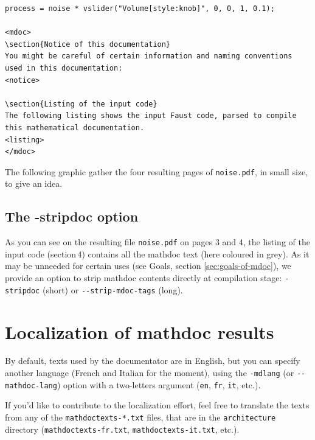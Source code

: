 \documentclass[a4paper]{book}
\begin{document}
\begin{lstlisting}
process = noise * vslider("Volume[style:knob]", 0, 0, 1, 0.1);

<mdoc>
\section{Notice of this documentation}
You might be careful of certain information and naming conventions used in this documentation:
<notice>

\section{Listing of the input code}
The following listing shows the input Faust code, parsed to compile this mathematical documentation.
<listing>
</mdoc>
\end{lstlisting}
\normalsize

The following graphic gather the four resulting pages of \lstinline!noise.pdf!, in small size, to give an idea.




\subsection{The -stripdoc option}
\label{sec:striping-option}

As you can see on the resulting file \lstinline!noise.pdf! on pages 3 and 4, the listing of the input code (section\,4) contains all the mathdoc text (here coloured in grey). As it may be unneeded for certain uses (see Goals, section \ref{sec:goals-of-mdoc}), we provide an option to strip mathdoc contents directly at compilation stage: \lstinline!-stripdoc! (short) or \lstinline!--strip-mdoc-tags! (long).


\section{Localization of mathdoc results}
\label{sec:localization-mdoc}

By default, texts used by the documentator are in English, but you can specify another language (French and Italian for the moment), using the \lstinline!-mdlang! (or \lstinline!--mathdoc-lang!) option with a two-letters argument (\lstinline!en!, \lstinline!fr!, \lstinline!it!, etc.).

If you'd like to contribute to the localization effort, feel free to translate the texts from any of the \lstinline!mathdoctexts-*.txt! files, that are in the \lstinline!architecture! directory (\lstinline!mathdoctexts-fr.txt!, \lstinline!mathdoctexts-it.txt!, etc.).
\end{document}
